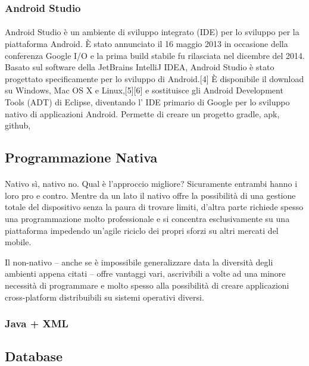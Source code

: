 \documentclass{article}
\begin{document}
\subsubsection{Android Studio}
  \paragraph{}
Android Studio \autocite[1]{HTMLIT:1} è un ambiente di sviluppo integrato (IDE) per lo sviluppo per la piattaforma Android. È stato annunciato il 16 maggio 2013 in occasione della conferenza Google I/O e la prima build stabile fu rilasciata nel dicembre del 2014.
Basato sul software della JetBrains IntelliJ IDEA, Android Studio è stato progettato specificamente per lo sviluppo di Android.[4] È disponibile il download su Windows, Mac OS X e Linux,[5][6] e sostituisce gli Android Development Tools (ADT) di Eclipse, diventando l' IDE primario di Google per lo sviluppo nativo di applicazioni Android.
Permette di creare un progetto gradle, apk, github, 

\subsection{Programmazione Nativa}
  \paragraph{}
Nativo sì, nativo no. Qual è l’approccio migliore? Sicuramente entrambi hanno i loro pro e contro. Mentre da un lato il nativo offre la possibilità di una gestione totale del dispositivo senza la paura di trovare limiti, d’altra parte richiede spesso una programmazione molto professionale e si concentra esclusivamente su una piattaforma impedendo un’agile riciclo dei propri sforzi su altri mercati del mobile.

Il non-nativo – anche se è impossibile generalizzare data la diversità degli ambienti appena citati – offre vantaggi vari, ascrivibili a volte ad una minore necessità di programmare e molto spesso alla possibilità di creare applicazioni cross-platform distribuibili su sistemi operativi diversi.

\subsubsection{Java + XML}

\subsection{Database}
\end{document}
